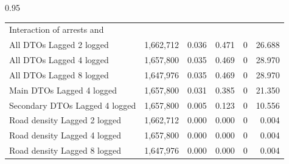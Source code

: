 \documentclass[12pt,letterpaper]{article}
\begin{document}
\begin{table}[h!]
\begin{spacing}{0.95}
\begin{tabular}{lrrrrr}
												
												
	Interaction of arrests and 	&		&		&		&		&		 \\
	\hspace{1em} All DTOs Lagged 2 logged	&	 1,662,712 	&	0.036	&	0.471	&	0	&	26.688	 \\
	\hspace{1em} All DTOs Lagged 4 logged	&	 1,657,800 	&	0.035	&	0.469	&	0	&	28.970	 \\
	\hspace{1em} All DTOs Lagged 8 logged	&	 1,647,976 	&	0.035	&	0.469	&	0	&	28.970	 \\
	\hspace{1em} Main DTOs Lagged 4 logged	&	 1,657,800 	&	0.031	&	0.385	&	0	&	21.350	 \\
	\hspace{1em} Secondary DTOs Lagged 4 logged	&	 1,657,800 	&	0.005	&	0.123	&	0	&	10.556	 \\
	\hspace{1em} Road density Lagged 2 logged	&	 1,662,712 	&	0.000	&	0.000	&	0	&	0.004	 \\
	\hspace{1em} Road density Lagged 4 logged	&	 1,657,800 	&	0.000	&	0.000	&	0	&	0.004	 \\
	\hspace{1em} Road density Lagged 8 logged	&	 1,647,976 	&	0.000	&	0.000	&	0	&	0.004	 \\
												

\end{tabular}
\end{spacing}
\end{table}
\end{document}
